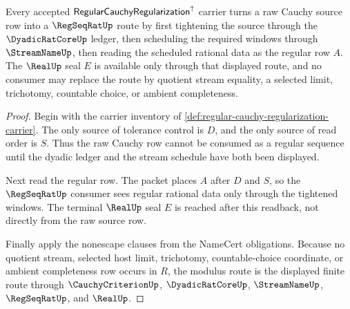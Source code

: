 \begin{theorem}
\label{thm:regular-cauchy-regularization-modulus-route}
Every accepted $\mathsf{RegularCauchyRegularization}^{\uparrow}$ carrier turns a raw Cauchy source row into a $\RegSeqRatUp$ route by first tightening the source through the $\DyadicRatCoreUp$ ledger, then scheduling the required windows through $\StreamNameUp$, then reading the scheduled rational data as the regular row $A$. The $\RealUp$ seal $E$ is available only through that displayed route, and no consumer may replace the route by quotient stream equality, a selected limit, trichotomy, countable choice, or ambient completeness.
\end{theorem}
\begin{proof}
Begin with the carrier inventory of \autoref{def:regular-cauchy-regularization-carrier}. The only source of tolerance control is $D$, and the only source of read order is $S$. Thus the raw Cauchy row cannot be consumed as a regular sequence until the dyadic ledger and the stream schedule have both been displayed.

Next read the regular row. The packet places $A$ after $D$ and $S$, so the $\RegSeqRatUp$ consumer sees regular rational data only through the tightened windows. The terminal $\RealUp$ seal $E$ is reached after this readback, not directly from the raw source row.

Finally apply the nonescape clauses from the NameCert obligations. Because no quotient stream, selected host limit, trichotomy, countable-choice coordinate, or ambient completeness row occurs in $R$, the modulus route is the displayed finite route through $\CauchyCriterionUp$, $\DyadicRatCoreUp$, $\StreamNameUp$, $\RegSeqRatUp$, and $\RealUp$.
\end{proof}


\begin{closurestatus}{\RegularCauchyRegularizationUp}
  \theoryclosure{\seedClosure}
  \formalstatus{\unformalizedV}
\end{closurestatus}
